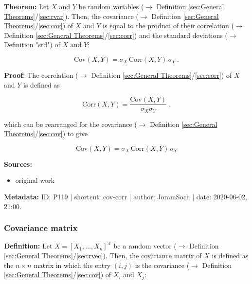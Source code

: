 \documentclass[a4paper,12pt,twoside]{book}
\begin{document}
\textbf{Theorem:} Let $X$ and $Y$ be random variables ($\rightarrow$ Definition \ref{sec:General Theorems}/\ref{sec:rvar}). Then, the covariance ($\rightarrow$ Definition \ref{sec:General Theorems}/\ref{sec:cov}) of $X$ and $Y$ is equal to the product of their correlation ($\rightarrow$ Definition \ref{sec:General Theorems}/\ref{sec:corr}) and the standard deviations ($\rightarrow$ Definition "std") of $X$ and $Y$:

\begin{equation} \label{eq:cov-corr-cov-corr}
\mathrm{Cov}(X,Y) = \sigma_X \, \mathrm{Corr}(X,Y) \, \sigma_Y \; .
\end{equation}


\vspace{1em}
\textbf{Proof:} The correlation ($\rightarrow$ Definition \ref{sec:General Theorems}/\ref{sec:corr}) of $X$ and $Y$ is defined as

\begin{equation} \label{eq:cov-corr-corr}
\mathrm{Corr}(X,Y) = \frac{\mathrm{Cov}(X,Y)}{\sigma_X \sigma_Y} \; .
\end{equation}

which can be rearranged for the covariance ($\rightarrow$ Definition \ref{sec:General Theorems}/\ref{sec:cov}) to give

\begin{equation} \label{eq:cov-corr-cov-corr-qed}
\mathrm{Cov}(X,Y) = \sigma_X \, \mathrm{Corr}(X,Y) \, \sigma_Y
\end{equation}


\vspace{1em}
\textbf{Sources:}
\begin{itemize}
\item original work\end{itemize}


\vspace{1em}
\textbf{Metadata:} ID: P119 | shortcut: cov-corr | author: JoramSoch | date: 2020-06-02, 21:00.
\vspace{1em}



\subsubsection[\textit{Covariance matrix}]{Covariance matrix} \label{sec:covmat}
\setcounter{equation}{0}

\textbf{Definition:} Let $X = [X_1, \ldots, X_n]^\mathrm{T}$ be a random vector ($\rightarrow$ Definition \ref{sec:General Theorems}/\ref{sec:rvec}). Then, the covariance matrix of $X$ is defined as the $n \times n$ matrix in which the entry $(i,j)$ is the covariance ($\rightarrow$ Definition \ref{sec:General Theorems}/\ref{sec:cov}) of $X_i$ and $X_j$:
\end{document}
